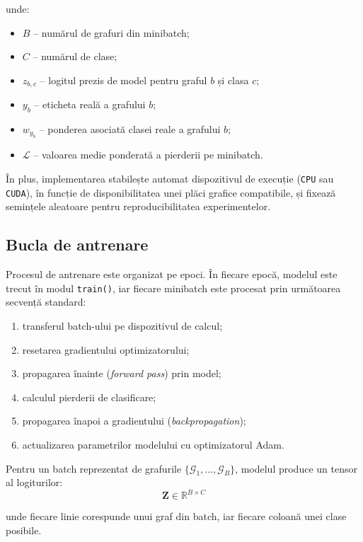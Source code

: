 \documentclass[12pt,a4paper]{report}
\theoremstyle{definition}
\theoremstyle{remark}
\begin{document}
\noindent unde:
\begin{itemize}
    \item $B$ -- numărul de grafuri din minibatch;
    \item $C$ -- numărul de clase;
    \item $z_{b,c}$ -- logitul prezis de model pentru graful $b$ și clasa $c$;
    \item $y_b$ -- eticheta reală a grafului $b$;
    \item $w_{y_b}$ -- ponderea asociată clasei reale a grafului $b$;
    \item $\mathcal{L}$ -- valoarea medie ponderată a pierderii pe minibatch.
\end{itemize}

În plus, implementarea stabilește automat dispozitivul de execuție (\texttt{CPU} sau
\texttt{CUDA}), în funcție de disponibilitatea unei plăci grafice compatibile, și
fixează semințele aleatoare pentru reproducibilitatea experimentelor.

\subsection{Bucla de antrenare}

Procesul de antrenare este organizat pe epoci. În fiecare epocă, modelul este trecut în modul \texttt{train()}, iar fiecare minibatch este procesat prin următoarea secvență standard:
\begin{enumerate}
    \item transferul batch-ului pe dispozitivul de calcul;
    \item resetarea gradientului optimizatorului;
    \item propagarea înainte (\textit{forward pass}) prin model;
    \item calculul pierderii de clasificare;
    \item propagarea înapoi a gradientului (\textit{backpropagation});
    \item actualizarea parametrilor modelului cu optimizatorul Adam.
\end{enumerate}

Pentru un batch reprezentat de grafurile $\{\mathcal{G}_1, \ldots, \mathcal{G}_B\}$, modelul produce un tensor al logiturilor:
\begin{equation}
    \mathbf{Z} \in \mathbb{R}^{B \times C}
    \label{eq:logits_batch}
\end{equation}

\noindent unde fiecare linie corespunde unui graf din batch, iar fiecare coloană unei clase posibile.
\end{document}
